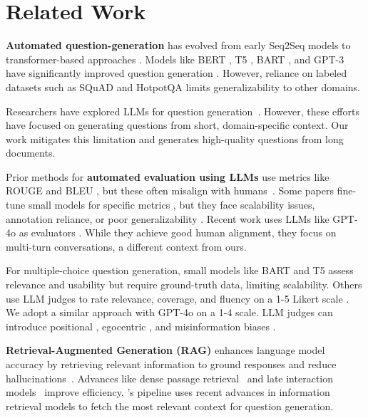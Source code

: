 \section{Related Work}
\label{sec:related-work}

\textbf{Automated question-generation} has evolved from early Seq2Seq models \cite{du-etal-2017-learning, Neural_QG} to transformer-based approaches \cite{attention_is_all_you_need}. Models like BERT \cite{devlin-etal-2019-bert}, T5 \cite{t5}, BART \cite{lewis-etal-2020-bart}, and GPT-3 \cite{gpt_3} have significantly improved question generation \cite{chan-fan-2019-bert, li-etal-2021-addressing-semantic}. However, reliance on labeled datasets such as SQuAD \cite{rajpurkar-etal-2016-squad} and HotpotQA \cite{yang-etal-2018-hotpotqa} limits generalizability to other domains.

Researchers have explored LLMs for question generation~\cite{knowledge_base_prompting, reading_comprehension_language_llm, code_QG, mcq_computing, MIT_law}. However, these efforts have focused on generating questions from short, domain-specific context. Our work mitigates this limitation and generates high-quality questions from long documents.


Prior methods for \textbf{automated evaluation using LLMs} use metrics like ROUGE \cite{lin-2004-rouge} and BLEU \cite{papineni-etal-2002-bleu}, but these often misalign with humans~\cite{guo2024survey-neural-question-gen}. Some papers fine-tune small models for specific metrics \cite{zhu2023judgelm, wang2024pandalm}, but they face scalability issues, annotation reliance, or poor generalizability \cite{zhu2023judgelm}. Recent work uses  LLMs like GPT-4o as evaluators \cite{zheng2023judging, lin2023llmevalunifiedmultidimensionalautomatic}. While they achieve good human alignment, they focus on multi-turn conversations, a different context from ours.

For multiple-choice question generation, small models like BART and T5 assess relevance and usability \cite{moon-etal-2024-generative, raina2022multiplechoicequestiongenerationautomated} but require ground-truth data, limiting scalability. Others use LLM judges to rate relevance, coverage, and fluency on a 1-5 Likert scale \cite{microsoft_agriculture}. 
We adopt a similar approach with GPT-4o on a 1-4 scale. 
LLM judges can introduce positional \cite{zheng2024large, wang-etal-2024-large-language-models-fair}, egocentric \cite{koo-etal-2024-benchmarking}, and misinformation biases \cite{chen-etal-2024-humans, koo-etal-2024-benchmarking}.


\textbf{Retrieval-Augmented Generation (RAG)} enhances language model accuracy by retrieving relevant information to ground responses and reduce hallucinations~\cite{lewis2020retrieval, shuster2021retrieval, colbertv2, gottumukkala2022investigating}. Advances like dense passage retrieval~\cite{karpukhin2020dense} and late interaction models~\cite{colbert} improve efficiency. \name's pipeline uses recent advances in information retrieval models to fetch the most relevant context for question generation.